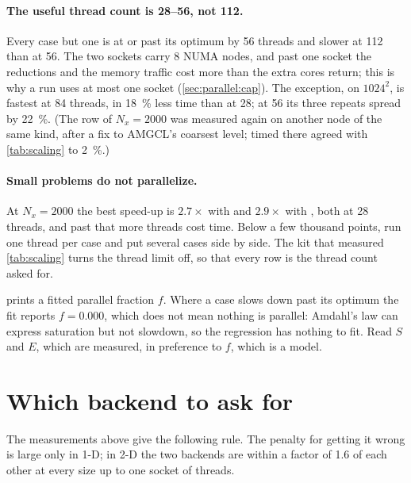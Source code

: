 \paragraph{The useful thread count is 28--56, not 112.}
Every case but one is at or past its optimum by 56 threads and slower at 112
than at 56. The two sockets carry 8 NUMA nodes, and past one
socket the reductions and the memory traffic cost more than the extra cores
return; this is why a run uses at most one socket (\cref{sec:parallel:cap}).
The exception,  on $1024^2$, is fastest at 84 threads, in
\SI{18}{\percent} less time than at 28; at 56 its three repeats spread by
\SI{22}{\percent}. (The  row of $N_x = 2000$ was measured
again on another node of the same kind, after a fix to AMGCL's coarsest level;
 timed there agreed with \cref{tab:scaling} to \SI{2}{\percent}.)

\paragraph{Small problems do not parallelize.}
At $N_x = 2000$ the best speed-up is $2.7\times$ with  and
$2.9\times$ with , both at 28 threads, and past that more threads
cost time. Below a few thousand points,
run one thread per case and put several cases side by side. The kit that
measured \cref{tab:scaling} turns the thread limit off, so that every row is
the thread count asked for.

\begin{note}
   prints a fitted parallel fraction $f$.
  Where a case slows down past its optimum the fit reports $f = 0.000$, which
  does not mean nothing is parallel: Amdahl's law can express saturation but
  not slowdown, so the regression has nothing to fit. Read $S$ and $E$,
  which are measured, in preference to $f$, which is a model.
\end{note}

\section{Which backend to ask for}
\label{sec:parallel:backend}

The measurements above give the following rule. The penalty for getting it
wrong is large only in 1-D; in 2-D the two backends are within a factor of
1.6 of each other at every size up to one socket of threads.

